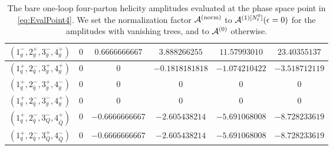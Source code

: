 \begin{table}[h]
\begin{adjustbox}{width=1\textwidth}
\begin{tabular}{cccccc}
      $(1_g^-,2_g^+,3_g^-,4_g^+)$ & $0$ & $0.6666666667$ &
      $3.888266255$ & $11.57993010$ & $23.40355137$ \\
      \midrule
      $(1_q^+,2_{\bar q}^-,3_g^+,4_g^+)$ & $0$ & $0$ &
      $-0.1818181818$ & $-1.074210422$ & $-3.518712119$ \\
      $(1_q^+,2_{\bar q}^-,3_g^+,4_g^-)$ & $0$ & $0$ & $0$ & $0$ & $0$ \\
      $(1_q^+,2_{\bar q}^-,3_g^-,4_g^+)$ & $0$ & $0$ & $0$ & $0$ & $0$ \\
      \midrule
      $(1_q^+,2_{\bar q}^-,3_Q^-,4_{\bar Q}^+)$ & $0$ &
      $-0.6666666667$ & $-2.605438214$ & $-5.691068008$ &
      $-8.728233619$ \\
      $(1_q^+,2_{\bar q}^-,3_Q^+,4_{\bar Q}^-)$ & $0$ &
      $-0.6666666667$ & $-2.605438214$ & $-5.691068008$ &
      $-8.728233619$ \\
      \bottomrule
    \end{tabular}
  \end{adjustbox}
\caption{The bare one-loop four-parton helicity amplitudes 
  evaluated at the phase space point in \cref{eq:EvalPoint4}. We set the
    normalization factor $\mathcal{A}^\mathrm{(norm)}$ to $\mathcal{A}^{(1)[N_\mathrm{f}^0]}(\epsilon=0)$ for the
    amplitudes with vanishing trees, and to $\mathcal{A}^{(0)}$ otherwise.}
  \label{tab:results4parton1L}
\end{table}

